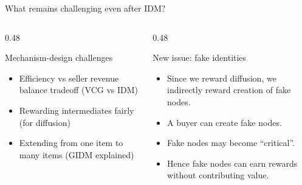 \documentclass[10pt,aspectratio=169]{beamer}
\begin{document}
\begin{frame}{What remains challenging even after IDM?}
\begin{columns}[T,totalwidth=\textwidth]
\begin{column}{0.48\textwidth}
\begin{block}{Mechanism-design challenges}
\begin{itemize}
    \item Efficiency vs seller revenue balance tradeoff (VCG vs IDM)
    \item Rewarding intermediates fairly (for diffusion)
    \item Extending from one item to many items (GIDM explained)
\end{itemize}
\end{block}
\end{column}
\begin{column}{0.48\textwidth}
\begin{alertblock}{New issue: fake identities}
\begin{itemize}
    \item Since we reward diffusion, we indirectly reward creation of fake nodes.
    \item A buyer can create fake nodes.
    \item Fake nodes may become ``critical''.
    \item Hence fake nodes can earn rewards without contributing value.
\end{itemize}
\end{alertblock}
\end{column}
\end{columns}
\vspace{3mm}
\begin{center}

\end{center}
\end{frame}
\end{document}
